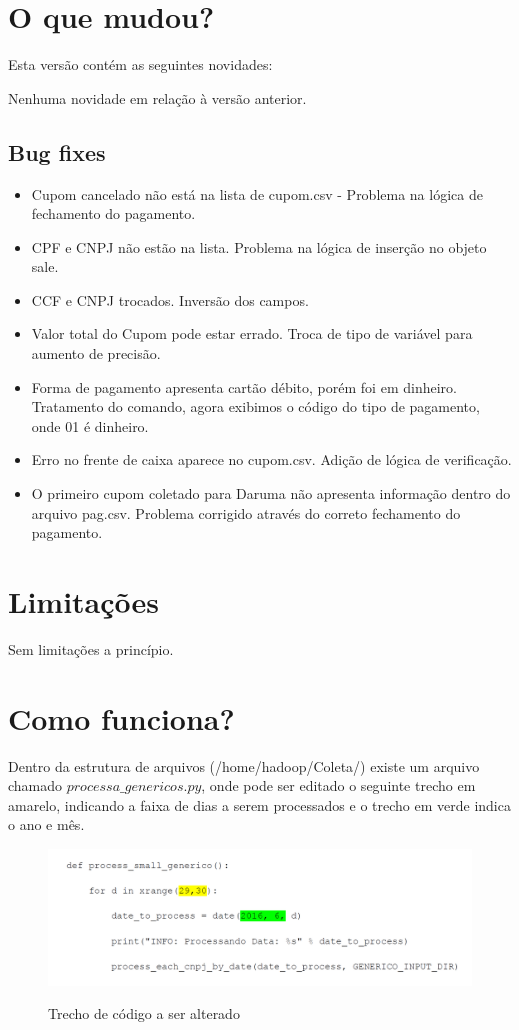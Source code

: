 \documentclass{article}      %
\begin{document}
\section{O que mudou?}
Esta versão contém as seguintes novidades:

Nenhuma novidade em relação à versão anterior.

\subsection{Bug fixes}
\begin{itemize}
    \item Cupom cancelado não está na lista de cupom.csv - Problema na lógica de fechamento do pagamento.
    \item CPF e CNPJ não estão na lista. Problema na lógica de inserção no objeto sale.
    \item CCF e CNPJ trocados. Inversão dos campos. 
    \item Valor total do Cupom pode estar errado. Troca de tipo de variável para aumento de precisão.
    \item Forma de pagamento apresenta cartão débito, porém foi em dinheiro. Tratamento do comando, agora exibimos o código do tipo de pagamento, onde 01 é dinheiro.
    \item Erro no frente de caixa aparece no cupom.csv. Adição de lógica de verificação.
    \item O primeiro cupom coletado para Daruma não apresenta informação dentro do arquivo pag.csv. Problema corrigido através do correto fechamento do pagamento. 
\end{itemize}


\section{Limitações}
Sem limitações a princípio.

\section{Como funciona?}

Dentro da estrutura de arquivos (/home/hadoop/Coleta/) existe um arquivo chamado $processa\_genericos.py$, onde pode ser editado o seguinte trecho em amarelo, indicando a faixa de dias a serem processados e o trecho em verde indica o ano e mês.

\begin{figure}[!ht]
  \centering
    \includegraphics[width=1.0\textwidth]{genericos.png}
  \label{fig:genericos}
  \caption{Trecho de código a ser alterado}
\end{figure}
\end{document}
